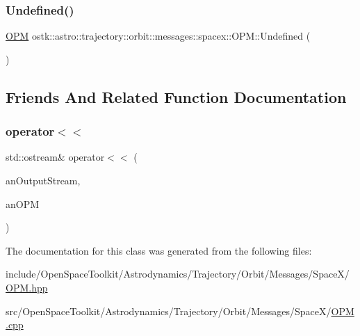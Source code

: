 \subsubsection{\texorpdfstring{Undefined()}{Undefined()}}
{\footnotesize\ttfamily \hyperlink{classostk_1_1astro_1_1trajectory_1_1orbit_1_1messages_1_1spacex_1_1_o_p_m}{O\+PM} ostk\+::astro\+::trajectory\+::orbit\+::messages\+::spacex\+::\+O\+P\+M\+::\+Undefined (\begin{DoxyParamCaption}{ }\end{DoxyParamCaption})\hspace{0.3cm}{\ttfamily [static]}}



\subsection{Friends And Related Function Documentation}
\mbox{\label{classostk_1_1astro_1_1trajectory_1_1orbit_1_1messages_1_1spacex_1_1_o_p_m_a6eda3865ebfda6f309f8ac0f071ece85}} 
\subsubsection{\texorpdfstring{operator$<$$<$}{operator<<}}
{\footnotesize\ttfamily std\+::ostream\& operator$<$$<$ (\begin{DoxyParamCaption}\item[{std\+::ostream \&}]{an\+Output\+Stream,  }\item[{const \hyperlink{classostk_1_1astro_1_1trajectory_1_1orbit_1_1messages_1_1spacex_1_1_o_p_m}{O\+PM} \&}]{an\+O\+PM }\end{DoxyParamCaption})\hspace{0.3cm}{\ttfamily [friend]}}



The documentation for this class was generated from the following files\+:\begin{DoxyCompactItemize}
\item 
include/\+Open\+Space\+Toolkit/\+Astrodynamics/\+Trajectory/\+Orbit/\+Messages/\+Space\+X/\hyperlink{_o_p_m_8hpp}{O\+P\+M.\+hpp}\item 
src/\+Open\+Space\+Toolkit/\+Astrodynamics/\+Trajectory/\+Orbit/\+Messages/\+Space\+X/\hyperlink{_o_p_m_8cpp}{O\+P\+M.\+cpp}\end{DoxyCompactItemize}
